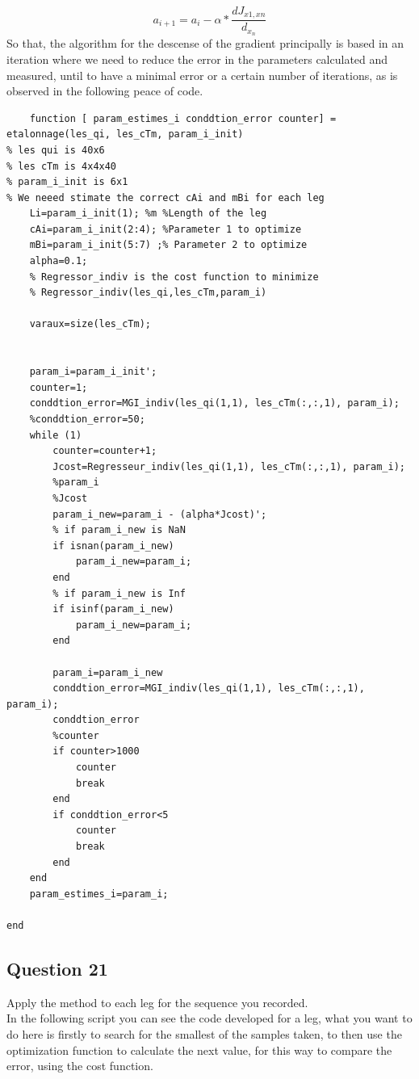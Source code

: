 \documentclass[12pt, twoside]{report}
\begin{document}
\begin{equation}
    a_{i+1}=a_{i}- \alpha*\dfrac{dJ_{x1,xn}}{d_{x_n}}
    \label{eq:eq1des}
\end{equation}
So that, the algorithm for the descense of the gradient principally is based in an iteration where we need to reduce the error in the parameters calculated and measured, until to have a minimal error or a certain number of iterations, as is observed in the following peace of code.
\begin{lstlisting}
    function [ param_estimes_i conddtion_error counter] = etalonnage(les_qi, les_cTm, param_i_init)
% les qui is 40x6 
% les cTm is 4x4x40
% param_i_init is 6x1
% We neeed stimate the correct cAi and mBi for each leg
    Li=param_i_init(1); %m %Length of the leg 
    cAi=param_i_init(2:4); %Parameter 1 to optimize 
    mBi=param_i_init(5:7) ;% Parameter 2 to optimize
    alpha=0.1;
    % Regressor_indiv is the cost function to minimize
    % Regressor_indiv(les_qi,les_cTm,param_i)

    varaux=size(les_cTm);
    
    
    param_i=param_i_init';
    counter=1;
    conddtion_error=MGI_indiv(les_qi(1,1), les_cTm(:,:,1), param_i);
    %conddtion_error=50;
    while (1)
        counter=counter+1;
        Jcost=Regresseur_indiv(les_qi(1,1), les_cTm(:,:,1), param_i);
        %param_i
        %Jcost
        param_i_new=param_i - (alpha*Jcost)';
        % if param_i_new is NaN
        if isnan(param_i_new)
            param_i_new=param_i;
        end
        % if param_i_new is Inf
        if isinf(param_i_new)
            param_i_new=param_i;
        end 

        param_i=param_i_new
        conddtion_error=MGI_indiv(les_qi(1,1), les_cTm(:,:,1), param_i);
        conddtion_error
        %counter
        if counter>1000
            counter
            break
        end
        if conddtion_error<5 
            counter
            break
        end 
    end
    param_estimes_i=param_i;
   
end
\end{lstlisting}




\subsection{Question 21}
Apply the method to each leg for the sequence you recorded.\\
In the following script you can see the code developed for a leg, what you want to do here is firstly to search for the smallest of the samples taken, to then use the optimization function to calculate the next value, for this way to compare the error, using the cost function.
\end{document}
